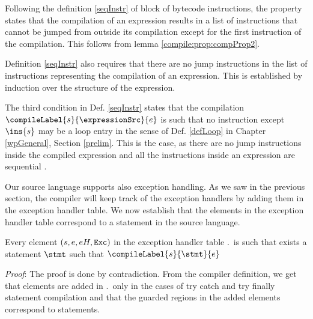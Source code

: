 Following the definition \ref{seqInstr} of block of bytecode instructions, 
the property states that the compilation of an expression results in a list of instructions that cannot be jumped from outside its compilation 
except for the first instruction of the compilation. This follows from lemma \ref{compile:prop:compProp2}. 

Definition \ref{seqInstr} also requires that there are no jump instructions  in the list of instructions representing the  compilation of an expression.
This is established by induction over the structure of the expression.

The third condition in Def. \ref{seqInstr} states that  the compilation $\compileLabel{s}{\expressionSrc}{e}$ is such that 
  no instruction except $\ins{s}$ may be  a loop entry  in the sense of Def.  \ref{defLoop} in Chapter
\ref{wpGeneral}, Section \ref{prelim}. This is the case, as there are no jump instructions inside the compiled expression  and all the instructions inside an
expression are sequential .

Our source language supports also exception handling. As we saw in the previous section, the compiler will keep track of the exception 
handlers by adding them in the exception handler table. We now establish that the elements in the exception handler table correspond to a statement
in the source language.

\begin{compProp7}\label{compile:prop:compProp7}
Every element  $ (s,e, eH, \mbox{\rm\texttt{Exc}} )$  in the exception handler table \methodd.\excHandlerTable  \
  is such that exists a statement $\stmt$ such that $\compileLabel{s}{\stmt}{e}$


\end{compProp7} 
\textit{Proof}:
The proof is done by contradiction. From the compiler definition, we get that  elements are added in 
 \methodd.\excHandlerTable \ only in the cases of 
try catch and try finally statement compilation and that the guarded regions in the added elements correspond to statements.


